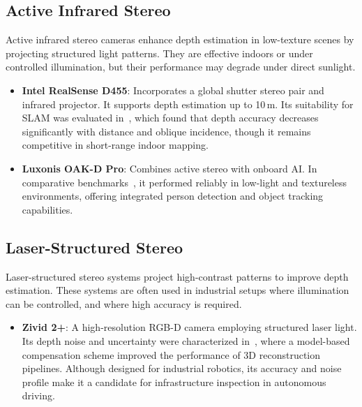 \subsection{Active Infrared Stereo}\label{sec:ActiveInfraredStereo}

Active infrared stereo cameras enhance depth estimation in low-texture scenes
by projecting structured light patterns. They are effective indoors or under
controlled illumination, but their performance may degrade under direct sunlight.

\begin{itemize}
  \item \textbf{Intel RealSense D455}: Incorporates a global shutter stereo pair
  and infrared projector. It supports depth estimation up to 10\,m. Its
  suitability for \gls{SLAM} was evaluated in~\cite{paperIntel}, which found that
  depth accuracy decreases significantly with distance and oblique incidence,
  though it remains competitive in short-range indoor mapping.

  \item \textbf{Luxonis OAK-D Pro}: Combines active stereo with onboard AI. In
  comparative benchmarks~\cite{paperStereoComparison}, it performed reliably
  in low-light and textureless environments, offering integrated person
  detection and object tracking capabilities.
\end{itemize}

\subsection{Laser-Structured Stereo}\label{sec:LaserStructuredStereo}

Laser-structured stereo systems project high-contrast patterns to improve
depth estimation. These systems are often used in industrial setups where
illumination can be controlled, and where high accuracy is required.

\begin{itemize}
  \item \textbf{Zivid 2+}: A high-resolution RGB-D camera employing structured
  laser light. Its depth noise and uncertainty were characterized in~\cite{paperZivid}, where a model-based compensation scheme improved the
  performance of 3D reconstruction pipelines. Although designed for industrial
  robotics, its accuracy and noise profile make it a candidate for
  infrastructure inspection in autonomous driving.
\end{itemize}

